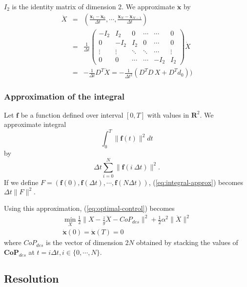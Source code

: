 \documentclass{article}
\newcommand\vect[1]{\mathbf{#1}}
\newcommand\dx{\vect{\dot{x}}}
\newcommand\ddx{\vect{\ddot{x}}}
\begin{document}
$I_2$ is the identity matrix of dimension 2.
We approximate $\ddx$ by
\begin{eqnarray*}
  \ddot{X} &=& \left(\frac{\dx_1-\dx_0}{\Delta t}, \cdots, \frac{\dx_{N}-\dx_{N-1}}{\Delta t}\right)\\
  &=& \frac{1}{\Delta t}\left(\begin{array}{cccccc}
    -I_2   & I_2    & 0      & \cdots & \cdots & 0 \\
    0      & -I_2   & I_2    & 0      & \cdots & 0 \\
    \vdots & \vdots & \ddots & \ddots & \cdots &\vdots \\
    0      & 0      & \cdots & \cdots & -I_2   & I_2
  \end{array}\right) \dot{X} \\
  \label{eq:ddotX}
  &=& -\frac{1}{\Delta t} D^T \dot{X} = -\frac{1}{\Delta t^2} (D^TD\,X + D^Td_0))
\end{eqnarray*}

\subsubsection{Approximation of the integral}

Let $\mathbf{f}$ be a function defined over interval $[0,T]$ with values in $\mathbf{R}^2$. We approximate integral
\begin{equation}
\label{eq:integral}
\int_{0}^{T} \|\mathbf{f}(t)\|^2dt
\end{equation}
by
\begin{equation}\label{eq:integral-approx}
\Delta t \sum_{i=0}^N \|\mathbf{f}(i\ \Delta t)\|^2.
\end{equation}
If we define $F=(\mathbf{f}(0), \mathbf{f}(\Delta t),\cdots,\mathbf{f}(N\Delta t))$, (\ref{eq:integral-approx}) becomes $\Delta t\|F\|^2$.

Using this approximation, (\ref{eq:optimal-control}) becomes
\begin{equation}
  \begin{array}{l}
    \min_{X}\frac{1}{2}\|X - \frac{z}{g}\ddot{X} - CoP_{des}\|^2 + \frac{1}{2}\alpha^2\|\dot{X}\|^2\\
    \dx(0)=\dx(T)=0
  \end{array}
  \label{eq:optimal-approx}
\end{equation}
where $CoP_{des}$ is the vector of dimension $2N$ obtained by stacking the values of $\vect{CoP}_{des}$ at $t=i\Delta t, i\in\{0,\cdots,N\}$.

\subsection{Resolution}
\end{document}
